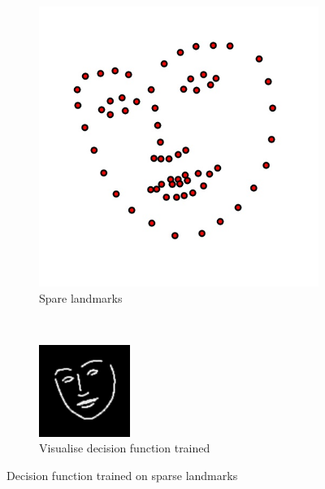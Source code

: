 \begin{figure}[h!]
    \centering
    \begin{subfigure}[b]{0.15\textwidth}
            \includegraphics[width=\textwidth]{resources/landmark}
        \caption{Spare landmarks}
    \end{subfigure}
    ~~~~~~~~~
    \begin{subfigure}[b]{0.15\textwidth}
            \includegraphics[width=\textwidth]{resources/svs}
        \caption{Visualise decision function trained}
        \label{fig:svs}
    \end{subfigure}
    \caption{Decision function trained on sparse landmarks}
    \label{fig:build_svs}
\end{figure}






